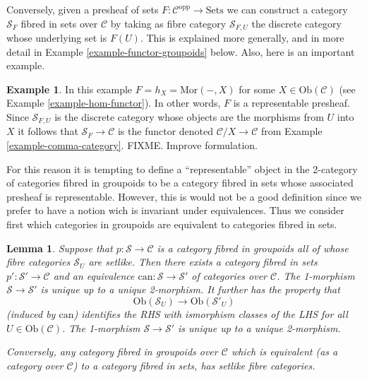 \documentclass{amsart}
\newtheorem{lemma}[theorem]{Lemma}
\theoremstyle{definition}
\newtheorem{example}[theorem]{Example}
\theoremstyle{remark}
\numberwithin{equation}{subsection}
\begin{document}
\smallskip\noindent
Conversely, given a presheaf of sets
$F : \mathcal{C}^{\text{opp}} \to \text{Sets}$
we can construct a category $\mathcal{S}_F$ fibred in sets
over $\mathcal{C}$ by taking as fibre category $\mathcal{S}_{F,U}$ 
the discrete category whose underlying set is $F(U)$. This is explained
more generally, and in more detail in Example \ref{example-functor-groupoids}
below. Also, here is an important example.

\begin{example}
\label{example-fibred-category-from-functor-of-points}
In this example $F = h_X = \text{Mor}(-,X)$ for some
$X \in \text{Ob}(\mathcal{C})$ (see Example \ref{example-hom-functor}).
In other words, $F$ is a representable presheaf.
Since $\mathcal{S}_{F,U}$ is the discrete category whose objects are the
morphisms from $U$ into $X$ it follows that
$\mathcal{S}_F\to \mathcal{C}$ is the functor denoted
$\mathcal{C}/X \to \mathcal{C}$ from
Example \ref{example-comma-category}.
FIXME. Improve formulation.
\end{example}

\smallskip\noindent
For this reason it is tempting to define a ``representable'' object in the
2-category of categories fibred in groupoids to be a category fibred in
sets whose associated presheaf is representable. However, this is would not
be a good definition since we prefer to have a notion wich is invariant under
equivalences. Thus we consider first which categories in groupoids are
equivalent to categories fibred in sets.

\begin{lemma}
\label{lemma-setlike-fibres}
Suppose that $p : \mathcal{S} \to \mathcal{C}$ is a category fibred in
groupoids all of whose fibre categories $\mathcal{S}_U$ are setlike. 
Then there exists a category fibred in sets $p' : \mathcal{S}' \to
\mathcal{C}$ and an equivalence
$\text{can}:\mathcal{S} \to \mathcal{S}'$ of categories over $\mathcal{C}$.
The 1-morphism $\mathcal{S}\to\mathcal{S}'$ is unique up to a unique
2-morphism. It further has the property that
$$
\text{Ob}(\mathcal{S}_U) \longrightarrow \text{Ob}(\mathcal{S}'_U) 
$$
(induced by $\text{can}$) identifies the RHS with ismorphism classes of the
LHS for all $U \in \text{Ob}(\mathcal{C})$. The 1-morphism
$\mathcal{S}\to\mathcal{S}'$ is unique up to a unique 2-morphism. 

\smallskip\noindent
Conversely, any category fibred in groupoids over $\mathcal{C}$ which
is equivalent (as a category over $\mathcal{C}$) to a category fibred 
in sets, has setlike fibre categories.
\end{lemma}
\end{document}
